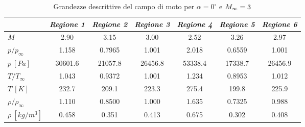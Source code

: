 \begin{table} [!h]\centering {}
	\begin{tabular}{l  c  c c c c c}
		\toprule
		& \emph{Regione 1}& \emph{Regione 2}& \emph{Regione 3}& \emph{Regione 4}& \emph{Regione 5}& \emph{Regione 6}   \\ 
		\midrule
		$M$	&	2.90	&	3.15	&	3.00	&	2.52	&	3.26	&	2.97	\\
		$p/p_{\infty}$ &   1.158	&	0.7965	&	1.001	&	2.018	&	0.6559	&	1.001	\\
		$p \ [\si{Pa}]$	&	30601.6	&	21057.8	&	26456.8	&	53338.4	&	17338.7	&	26456.9	\\
		$T/T_{\infty}$ &  1.043	&	0.9372	&	1.001	&	1.234	&	0.8953	&	1.012	\\
		$T \ [\si{K}]$	&	232.7	&	209.1	&	223.3	&	275.4	&	199.8	&	225.9	\\
		$\rho/\rho_{\infty}$ & 1.110	&	0.8500	&	1.000	&	1.635	&	0.7325	&	0.988	\\
		$\rho \ [\si{kg/m^3}]$	&	0.458	&	0.351	&	0.413	&	0.675	&	0.302	&	0.408	\\
		\bottomrule
	\end{tabular}
	\caption {\footnotesize Grandezze descrittive del campo di moto per $\alpha=0^\circ$ e $M_ {\infty}=3$}
	\label{tabS5}
\end{table}

